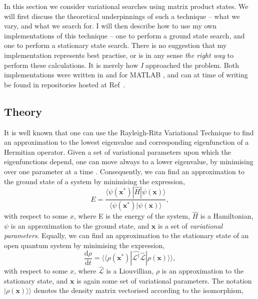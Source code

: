
In this section we consider variational searches using matrix product states. We will first discuss the theoretical underpinnings of such a technique -- what we vary, and what we search for. I will then describe how to use my own implementations of this technique -- one to perform a ground state search, and one to perform a stationary state search. There is no suggestion that my implementation represents best practise, or is in any sense \emph{the right way} to perform these calculations. It is merely how \emph{I} approached the problem. Both implementations were written in and for MATLAB \cite{MATLAB}, and can at time of writing be found in repositories hosted at Ref~\cite{otb:githome}.
 
 \subsection{Theory}
It is well known that one can use the Rayleigh-Ritz Variational Technique to find an approximation to the lowest eigenvalue and corresponding eigenfunction of a Hermitian operator. Given a set of variational parameters upon which the eigenfunctions depend, one can move always to a lower eigenvalue, by minimising over one parameter at a time \cite{ArfWeb_RRVT, Gasiorowicz_RVT}. Consequently, we can find an approximation to the ground state of a system by minimising the expression,
\begin{equation}
E = \frac{\langle \psi (\mathbf{x}^{*}) | \hat{H} | \psi (\mathbf{x}) \rangle}{\langle \psi (\mathbf{x}^{*}) | \psi (\mathbf{x}) \rangle},
\label{eq:vs1-1}
\end{equation}
with respect to some \(x\), where E is the energy of the system, \(\hat{H}\) is a Hamiltonian, \(\psi\) is an approximation to the ground state, and \( \mathbf{x} \) is a set of \emph{variational parameters}. Equally, we can find an approximation to the stationary state of an open quantum system by minimising the expression,
\begin{equation}
\frac{\mathrm{d}\rho}{\mathrm{d}t} = \langle \langle \rho(\mathbf{x}^{*}) | \hat{\mathcal{L}^{\dagger}} \hat{\mathcal{L}} | \rho(\mathbf{x}) \rangle \rangle,
\label{eq:vs1-2}
\end{equation}
with respect to some \(x\), where \(\hat{\mathcal{L}}\) is a Liouvillian, \(\rho\) is an approximation to the stationary state, and \(\mathbf{x}\) is again some set of variational parameters. The notation \(|\rho (\mathbf{x}) \rangle \rangle\) denotes the density matrix vectorised according to the isomorphism,
